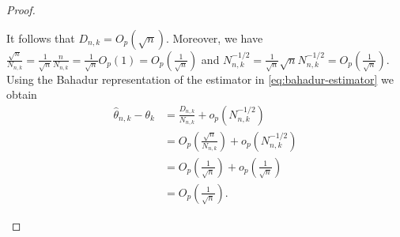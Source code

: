 \documentclass[11pt]{article}
\theoremstyle{plain}
\theoremstyle{definition}
\begin{document}
\begin{appendix}
\begin{proof}
\begin{enumerate}[label=(\roman*)]
		It follows that \( D_{n,k} = O_p(\sqrt{n}) \). Moreover, we have \(\frac{\sqrt{n}}{N_{n,k}}  =\frac{1}{\sqrt{n}}\frac{n}{N_{n,k}} = \frac{1}{\sqrt{n}} O_p(1) = O_p\left(\frac{1}{\sqrt{n}}\right)\) and \(N_{n,k}^{-1/2} = \frac{1}{\sqrt{n}}\sqrt{n}N_{n,k}^{-1/2} = O_p\left(\frac{1}{\sqrt{n}}\right)\). Using the Bahadur representation of the estimator in \eqref{eq:bahadur-estimator} we obtain
			\begin{align*}
				\hat{\theta}_{n,k} - \theta_k
				&=
				\frac{D_{n,k}}{N_{n,k}}
				+ o_p\!\left(N_{n,k}^{-1/2}\right) \\
				&=
				O_p\!\left(\frac{\sqrt{n}}{N_{n,k}}\right)
				+ o_p\!\left(N_{n,k}^{-1/2}\right) \\
				&=
				O_p\!\left(\frac{1}{\sqrt{n}}\right) + o_p\!\left(\frac{1}{\sqrt{n}}\right)\\
				&=
				O_p\!\left(\frac{1}{\sqrt{n}}\right).
		\end{align*}
		

\end{enumerate}
\end{proof}
\end{appendix}
\end{document}
